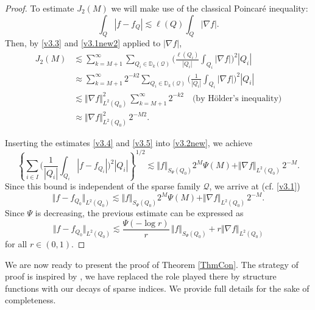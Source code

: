 \documentclass[11pt, a4paper,leqno]{amsart}
\theoremstyle{plain}
\numberwithin{equation}{section}
\theoremstyle{definition}
\theoremstyle{remark}
\begin{document}
\begin{proof}
To estimate $J_{2}(M)$ we will make use of the classical Poincar\'{e}
inequality:
\begin{equation}
\int_{Q}|f-f_{Q}|\lesssim\ell(Q)\int_{Q}|\nabla f|.\label{v3.3}%
\end{equation}
Then, by \eqref{v3.3} and \eqref{v3.1new2} applied to $|\nabla f|$,
\begin{align}
J_{2}(M) &  \lesssim\sum_{k=M+1}^{\infty}\sum_{Q_{i} \in 
\mathbb{D}_{k}(\mathcal{Q})}\bigg(\frac{\ell(Q_{i})}{|Q_{i}|}\int_{Q_{i}}|\nabla
f|\bigg)^{2}|Q_{i}|\nonumber\\
&  \approx\sum_{k=M+1}^{\infty}2^{-k2}\sum_{Q_{i}\in 
\mathbb{D}_{k}(\mathcal{Q})}\bigg(\frac{1}{|Q_{i}|}\int_{Q_{i}}|\nabla
f|\bigg)^{2}|Q_{i}|\nonumber\\
&  \lesssim\Vert\nabla f\Vert_{L^{2}(Q_{0})}^{2}\,\sum_{k=M+1}^{\infty}%
2^{-k2} \quad \text{(by H\"{o}lder's inequality)}\nonumber\\
&  \approx\Vert\nabla f\Vert_{L^{2}(Q_{0})}^{2}\,2^{-M2}.\label{v3.5}%
\end{align}


Inserting the estimates \eqref{v3.4} and \eqref{v3.5} into \eqref{v3.2new}, we
achieve
\[
\left\{  \sum_{i\in I}\bigg(\frac{1}{|Q_{i}|}\int_{Q_{i}}|f-f_{Q_{i}%
}|\bigg)^{2}|Q_{i}|\right\}  ^{1/2}\lesssim\Vert f\Vert_{S_{\Psi
}(Q_{0})}2^{M}\Psi(M)+\Vert\nabla f\Vert_{L^{2}(Q_{0})}\,2^{-M}.
\]
Since this bound is independent of the sparse family $\mathcal{Q}$, we arrive
at (cf. \eqref{v3.1})
\[
\Vert f-f_{Q_{0}}\Vert_{L^{2}(Q_{0})}\lesssim\Vert f\Vert_{S_{\Psi
}(Q_{0})}2^{M}\Psi(M)+\Vert\nabla f\Vert_{L^{2}(Q_{0})}\,2^{-M}.
\]
Since $\Psi$ is decreasing, the previous estimate can be
expressed as
\[
\Vert f-f_{Q_{0}}\Vert_{L^{2}(Q_{0})}\lesssim\frac{\Psi(-\log r)}{r}\,\Vert
f\Vert_{S_{\Psi}(Q_{0})}+r\Vert\nabla f\Vert_{L^{2}(Q_{0})}%
\]
for all $r\in(0,1).$
\end{proof}

We are now ready to present the proof of Theorem \ref{ThmCon}. The
strategy of proof is inspired by \cite{Lan}, we have replaced the role played
there by structure functions with our decays of sparse indices. We provide
full details for the sake of completeness.
\end{document}
